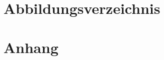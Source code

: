 \documentclass[a4paper, portrait, 12pt]{scrartcl} %
\begin{document}
\section{Abbildungsverzeichnis}
\listoffigures
\pagebreak




\appendix
\section{Anhang}
\label{sec:appendix_a}

  
\end{document}
